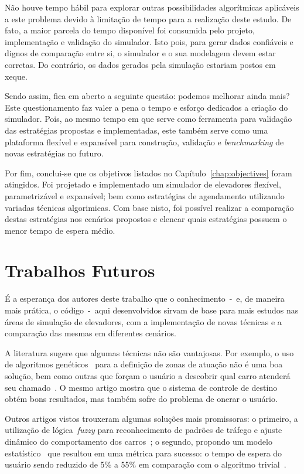 Não houve tempo hábil para explorar outras possibilidades algorítmicas
aplicáveis a este problema devido à limitação de tempo para a realização deste
estudo. De fato, a maior parcela do tempo disponível foi consumida pelo projeto,
implementação e validação do simulador. Isto pois, para gerar dados confiáveis e
dignos de comparação entre si, o simulador e o sua modelagem devem estar
corretas. Do contrário, os dados gerados pela simulação estariam postos em
xeque.

Sendo assim, fica em aberto a seguinte questão: podemos melhorar ainda mais?
Este questionamento faz valer a pena o tempo e esforço dedicados a criação do
simulador. Pois, ao mesmo tempo em que serve como ferramenta para validação das
estratégias propostas e implementadas, este também serve como uma plataforma
flexível e expansível para construção, validação e \textit{benchmarking} de
novas estratégias no futuro.

Por fim, conclui-se que os objetivos listados no Capítulo~\ref{chap:objectives}
foram atingidos. Foi projetado e implementado um simulador de elevadores
flexível, parametrizável e expansível; bem como estratégias de agendamento
utilizando variadas técnicas algorimicas. Com base nisto, foi possível realizar
a comparação destas estratégias nos cenários propostos e elencar quais
estratégias possuem o menor tempo de espera médio.

\section{Trabalhos Futuros}

É a esperança dos autores deste trabalho que o conhecimento~-~e, de maneira mais
prática, o código~-~aqui desenvolvidos sirvam de base para mais estudos nas
áreas de simulação de elevadores, com a implementação de novas técnicas e a
comparação das mesmas em diferentes cenários.

A literatura sugere que algumas técnicas não são vantajosas. Por exemplo, o uso
de algoritmos genéticos~\cite{KOEHLEROTTIGER02} para a definição de zonas de
atuação não é uma boa solução, bem como outras que forçam o usuário a descobrir
qual carro atenderá seu chamado~\cite{KOEHLEROTTIGER02}. O mesmo artigo mostra que o sistema de controle
de destino~\cite{KOEHLEROTTIGER02} obtém bons resultados, mas também sofre do
problema de onerar o usuário.

Outros artigos vistos trouxeram algumas soluções mais promissoras: o
primeiro, a utilização de lógica~\textit{fuzzy} para reconhecimento de padrões
de tráfego e ajuste dinâmico do comportamento dos carros~\cite{marja97}; o
segundo, propondo um modelo estatístico~\cite{DBLP:journals/corr/abs-1212-2499}
que resultou em uma métrica para sucesso: o tempo de espera do usuário sendo
reduzido de 5\% a 55\% em comparação com o algoritmo
trivial~\cite{DBLP:journals/corr/abs-1212-2499}.

